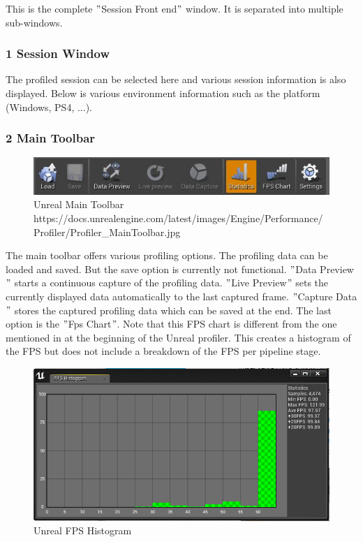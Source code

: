 This is the complete $"$Session Front end$"$ window. It is separated into multiple sub-windows.

\subsubsection{1 Session Window}
The profiled session can be selected here and various session information is also displayed.
Below is various environment information such as the platform (Windows, PS4, ...).

\subsubsection{2 Main Toolbar}

\begin{figure}[htbp]
\includegraphics[scale = 0.5]{img/Unreal_MainToolbar.jpg}
\caption{Unreal Main Toolbar https://docs.unrealengine.com/latest/images/Engine/Performance/Profiler/Profiler\_MainToolbar.jpg}
\label{fig:UnrealMainToolbar}
\end{figure}

The main toolbar offers various profiling options. The profiling data can be loaded and saved. But the save option is currently not functional. $"$Data Preview$"$ starts a continuous capture of the profiling data. $"$Live Preview$"$ sets the currently displayed data automatically to the last captured frame. $"$Capture Data$"$ stores the captured profiling data which can be saved at the end. The last option is the $"$Fps Chart$"$. Note that this FPS chart is different from the one mentioned in at the beginning of the Unreal profiler. This creates a histogram of the FPS but does not include a breakdown of the FPS per pipeline stage.
\citep{unreal_profiler}

\begin{figure}[htbp]
\includegraphics[scale = 0.39]{img/Unreal_FpsHistogram.PNG}
\caption{Unreal FPS Histogram}
\label{fig:UnrealFPSHistogram}
\end{figure}

